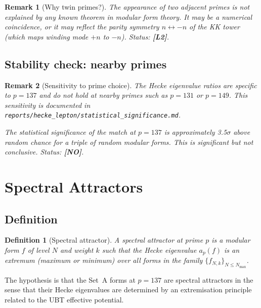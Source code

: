 \documentclass[11pt,a4paper]{article}
\newtheorem{definition}{Definition}
\newtheorem{remark}{Remark}
\begin{document}
\begin{remark}[Why twin primes?]
  The appearance of two adjacent primes is not explained by any known
  theorem in modular form theory.  It may be a numerical coincidence,
  or it may reflect the parity symmetry $n \leftrightarrow -n$ of the
  KK tower (which maps winding mode $+n$ to $-n$).
  Status: \textbf{[L2]}.
\end{remark}

\subsection{Stability check: nearby primes}

\begin{remark}[Sensitivity to prime choice]
  The Hecke eigenvalue ratios are specific to $p = 137$ and do not hold
  at nearby primes such as $p = 131$ or $p = 149$.  This sensitivity is
  documented in \texttt{reports/hecke\_lepton/statistical\_significance.md}.

  The statistical significance of the match at $p = 137$ is approximately
  3.5$\sigma$ above random chance for a triple of random modular forms.
  This is significant but not conclusive.  Status: \textbf{[NO]}.
\end{remark}

\section{Spectral Attractors}
\label{sec:attractors}

\subsection{Definition}

\begin{definition}[Spectral attractor]\label{def:attractor}
  A \emph{spectral attractor} at prime $p$ is a modular form $f$ of level $N$
  and weight $k$ such that the Hecke eigenvalue $a_p(f)$ is an extremum
  (maximum or minimum) over all forms in the family $\{f_{N, k}\}_{N \leq N_{\max}}$.
\end{definition}

The hypothesis is that the Set~A forms at $p = 137$ are spectral attractors in
the sense that their Hecke eigenvalues are determined by an extremisation
principle related to the UBT effective potential.
\end{document}
